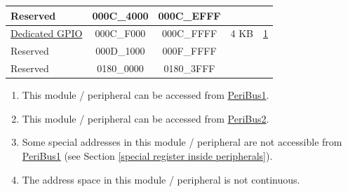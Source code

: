 \begin{longtable}[c]{ |p{5.0cm}|c|c|r|p{1.5cm}| }
    \rowcolor{gray!25}
  Reserved  & \hexprefix{}000C\_4000 & \hexprefix{}000C\_EFFF &        &              \\\hline
              \hyperref[mod:iomuxgpio]{Dedicated GPIO}     & \hexprefix{}000C\_F000 & \hexprefix{}000C\_FFFF &   4 KB &   \hyperref[PAM footnote: 1]{1}         \\\hline

    \rowcolor{gray!25}
   Reserved & \hexprefix{}000D\_1000 & \hexprefix{}000F\_FFFF &        &               \\\hline
    \rowcolor{gray!25}
    Reserved    & \hexprefix{}0180\_0000 & \hexprefix{}0180\_3FFF & &         \\

\end{longtable}

\begin{tiplisting}
\vspace{-2em}
\begin{enumerate}
\item \label{PAM footnote: 1}
This module / peripheral can be accessed from \hyperref[PeripheralBus1]{PeriBus1}.
\item \label{PAM footnote: 2}
This module / peripheral can be accessed from \hyperref[PeripheralBus2]{PeriBus2}.
\item \label{PAM footnote: 3}
Some special addresses in this module / peripheral are not accessible from \hyperref[PeripheralBus1]{PeriBus1} (see Section \ref{special register inside peripherals}).
\item \label{PAM footnote: 4}
The address space in this module / peripheral is not continuous.
\end{enumerate}
\end{tiplisting}
